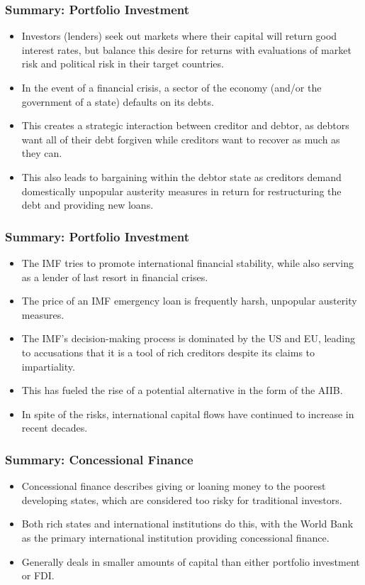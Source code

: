 \documentclass[handout]{beamer}
\begin{document}
\begin{frame} 
\frametitle{\LARGE{Summary: Portfolio Investment}}
\begin{itemize}
	\item Investors (lenders) seek out markets where their capital will return good interest rates, but balance this desire for returns with evaluations of market risk and political risk in their target countries.
	\item In the event of a financial crisis, a sector of the economy (and/or the government of a state) defaults on its debts. \pause
	\item This creates a strategic interaction between creditor and debtor, as debtors want all of their debt forgiven while creditors want to recover as much as they can. \pause
	\item This also leads to bargaining within the debtor state as creditors demand domestically unpopular austerity measures in return for restructuring the debt and providing new loans.
\end{itemize}
\end{frame}

\begin{frame} 
\frametitle{\LARGE{Summary: Portfolio Investment}}
\begin{itemize}
	\item The IMF tries to promote international financial stability, while also serving as a lender of last resort in financial crises. \pause
	\item The price of an IMF emergency loan is frequently harsh, unpopular austerity measures. \pause
	\item The IMF's decision-making process is dominated by the US and EU, leading to accusations that it is a tool of rich creditors despite its claims to impartiality.\pause
	\item This has fueled the rise of a potential alternative in the form of the AIIB. \pause
	\item In spite of the risks, international capital flows have continued to increase in recent decades.
\end{itemize}
\end{frame}

\begin{frame} 
	\frametitle{\LARGE{Summary: Concessional Finance}}
	\begin{itemize}
		\item Concessional finance describes giving or loaning money to the poorest developing states, which are considered too risky for traditional investors.
		\item Both rich states and international institutions do this, with the World Bank as the primary international institution providing concessional finance. \pause
		\item Generally deals in smaller amounts of capital than either portfolio investment or FDI. 	
	\end{itemize}
\end{frame}
\end{document}
